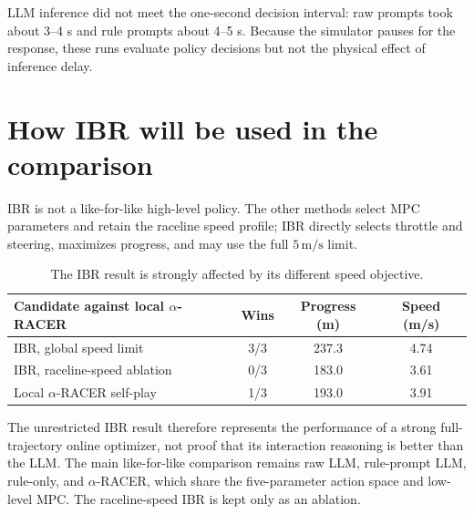\documentclass[11pt]{article}
\begin{document}
LLM inference did not meet the one-second decision interval: raw prompts took
about 3--4 s and rule prompts about 4--5 s. Because the simulator pauses for the
response, these runs evaluate policy decisions but not the physical effect of
inference delay.

\section{How IBR will be used in the comparison}

IBR is not a like-for-like high-level policy. The other methods select MPC
parameters and retain the raceline speed profile; IBR directly selects throttle
and steering, maximizes progress, and may use the full $5\,\mathrm{m/s}$ limit.

\begin{table}[ht]
  \centering
  \small
  \begin{tabular}{lccc}
    \toprule
    Candidate against local $\alpha$-RACER & Wins & Progress (m) & Speed (m/s) \\
    \midrule
    IBR, global speed limit    & 3/3 & 237.3 & 4.74 \\
    IBR, raceline-speed ablation & 0/3 & 183.0 & 3.61 \\
    Local $\alpha$-RACER self-play & 1/3 & 193.0 & 3.91 \\
    \bottomrule
  \end{tabular}
  \caption{The IBR result is strongly affected by its different speed objective.}
\end{table}

The unrestricted IBR result therefore represents the performance of a strong
full-trajectory online optimizer, not proof that its interaction reasoning is
better than the LLM. The main like-for-like comparison remains raw LLM,
rule-prompt LLM, rule-only, and $\alpha$-RACER, which share the five-parameter
action space and low-level MPC. The raceline-speed IBR is kept only as an
ablation.
\end{document}
